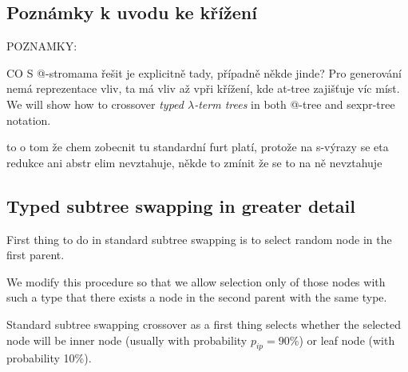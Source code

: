 \documentclass{sig-alternate}
\makeatletter
\newcommand{\lterm}{$\lambda$-term\xspace}
\newcommand{\atTree}{@-tree\xspace}
\newcommand{\sexprTree}{sexpr-tree\xspace}
\newcommand{\red}[1]{{\color{red} #1}}
\makeatother
\begin{document}
{  

}

\subsection{Poznámky k uvodu ke křížení}
\red{
POZNAMKY:

CO S @-stromama řešit je explicitně tady, případně někde jinde? Pro generování nemá reprezentace vliv, ta má vliv až vpři křížení, kde at-tree zajišťuje víc míst. We will show how to crossover \textit{typed \lterm trees} in both \atTree and \sexprTree notation.

to o tom že chem zobecnit tu standardní furt platí, protože na s-výrazy se eta redukce ani abstr elim nevztahuje, někde to zmínit že se to na ně nevztahuje
}


\subsection{Typed subtree swapping in greater detail}
\label{typed-swapping}

First thing to do in standard subtree swapping is to select random node
in the first parent. 

We modify this procedure so that we allow
selection only of those nodes with such a type that there exists  
a node in the second parent with the same type.

Standard subtree swapping crossover as a first thing selects 
whether the selected node will be inner node (usually with probability 
$p_{ip} = 90\%$) or leaf node (with probability 10\%).
\end{document}
